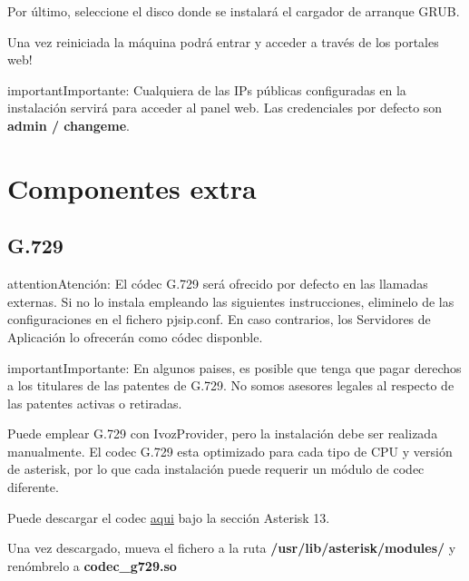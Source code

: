 \documentclass[letterpaper,10pt,spanish]{sphinxmanual}
\begin{document}
Por último, seleccione el disco donde se instalará el cargador de arranque GRUB.

\noindent{}

Una vez reiniciada la máquina podrá entrar y acceder a través de los portales web!

\begin{notice}{important}{Importante:}
Cualquiera de las IPs públicas configuradas en la instalación servirá para acceder al panel web. Las credenciales por defecto son \textbf{admin / changeme}.
\end{notice}


\section{Componentes extra}
\label{basic_concepts/installation/extra_components::doc}\label{basic_concepts/installation/extra_components:extra-components}

\subsection{G.729}
\label{basic_concepts/installation/extra_components:g-729}
\begin{notice}{attention}{Atención:}
El códec G.729 será ofrecido por defecto en las llamadas externas. Si no lo instala empleando las siguientes instrucciones, eliminelo de las configuraciones en el fichero pjsip.conf. En caso contrarios, los Servidores de Aplicación lo ofrecerán como códec disponble.
\end{notice}

\begin{notice}{important}{Importante:}
En algunos paises, es posible que tenga que pagar derechos a los titulares de las patentes de G.729. No somos asesores legales al respecto de las patentes activas o retiradas.
\end{notice}

Puede emplear G.729 con IvozProvider, pero la instalación debe ser realizada manualmente. El codec G.729 esta optimizado para cada tipo de CPU y versión de asterisk, por lo que cada instalación puede requerir un módulo de codec diferente.

Puede descargar el codec \href{http://asterisk.hosting.lv/}{aqui} bajo la sección Asterisk 13.

Una vez descargado, mueva el fichero  a la ruta \textbf{/usr/lib/asterisk/modules/} y renómbrelo a \textbf{codec\_g729.so}
\end{document}
